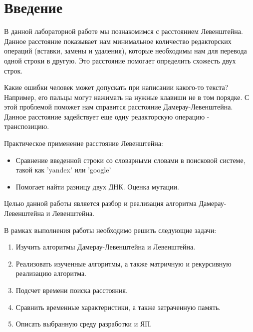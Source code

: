 \tableofcontents

\newpage
\chapter*{Введение}

В данной лабораторной работе мы познакомимся с расстоянием Левенштейна. Данное расстояние показывает нам минимальное количество редакторских операций (вставки, замены и удаления), которые необходимы нам для перевода одной строки в другую. Это расстояние помогает определить схожесть двух строк.

Какие ошибки человек может допускать при написании какого-то текста? Например, его пальцы могут нажимать на нужные клавиши не в том порядке. С этой проблемой поможет нам справится расстояние Дамерау-Левенштейна. Данное расстояние задействует еще одну редакторскую операцию - транспозицию.

Практическое применение расстояние Левенштейна:

\begin{itemize}
	\item Сравнение введенной строки со словарными словами в поисковой системе, такой как 'yandex' или 'google'
	\item Помогает найти разницу двух ДНК. Оценка мутации.
\end{itemize}

Целью данной работы является разбор и реализация алгоритма Дамерау-Левенштейна и Левенштейна.

В рамках выполнения работы необходимо решить следующие задачи:

\begin{enumerate}
	\item Изучить алгоритмы Дамерау-Левенштейна и Левенштейна.
	\item Реализовать изученные алгоритмы, а также матричную и рекурсивную реализацию алгоритма.
	\item Подсчет времени поиска расстояния.
	\item Сравнить временные характеристики, а также затраченную память.
	\item Описать выбранную среду разработки и ЯП.
\end{enumerate}